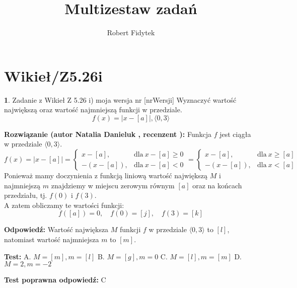 \documentclass[12pt, a4paper]{article}
\title{Multizestaw zadań}
\author{Robert Fidytek}
\date{}
\theoremstyle{definition} %
\newtheorem{zad}{}
\newcommand{\kategoria}[1]{\section{#1}} %
\newcommand{\zadStart}[1]{\begin{zad}#1\newline} %
\newcommand{\zadStop}{\end{zad}}   %
\newcommand{\rozwStart}[2]{\noindent \textbf{Rozwiązanie (autor #1 , recenzent #2): }\newline} %
\newcommand{\rozwStop}{\newline}                                            %
\newcommand{\odpStart}{\noindent \textbf{Odpowiedź:}\newline}    %
\newcommand{\odpStop}{\newline}                                             %
\newcommand{\testStart}{\noindent \textbf{Test:}\newline} %
\newcommand{\testStop}{\newline} %
\newcommand{\kluczStart}{\noindent \textbf{Test poprawna odpowiedź:}\newline} %
\newcommand{\kluczStop}{\newline} %
\begin{document}
\maketitle

\kategoria{Wikieł/Z5.26i}

\zadStart{Zadanie z Wikieł Z 5.26 i) moja wersja nr [nrWersji]}
Wyznaczyć wartość największą oraz wartość najmniejszą funkcji w przedziale. 
$$f(x) = \mid x - [a] \mid, \langle0,3\rangle$$
\zadStop

\rozwStart{Natalia Danieluk}{}
Funkcja $f$ jest ciągła w przedziale $\langle0,3\rangle$. 
$$ f(x) = \mid x - [a] \mid =  
\begin{cases} 
x - [a], & \text{dla} \ x - [a] \ge 0 \\
- (x - [a]), & \text{dla}\ x - [a] < 0
\end{cases} 
=  
\begin{cases} 
x - [a], & \text{dla} \ x \ge [a] \\
- (x - [a]), & \text{dla}\ x < [a]
\end{cases} 
$$
Ponieważ mamy doczynienia z funkcją liniową wartość największą $M$ i najmniejszą $m$ znajdziemy w miejscu zerowym równym $[a]$ oraz na końcach przedziału, tj. $f(0)$ i $f(3)$. \\
A zatem obliczamy te wartości funkcji:
$$ f([a]) = 0,\quad f(0) = [j],\quad f(3) = [k] $$
\rozwStop

\odpStart
Wartość największa $M$ funkcji $f$ w przedziale $\langle0,3\rangle$ to $[l]$, natomiast wartość najmniejsza $m$ to $[m]$.
\odpStop

\testStart
A. $M=[m], m=[l]$
B. $M=[g], m=0$
C. $M=[l], m=[m]$
D. $M=2, m=-2$
\testStop

\kluczStart
C
\kluczStop
\end{document}
